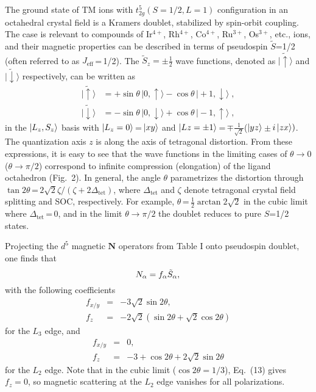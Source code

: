 \documentclass[twocolumn,prb,aps,showpacs,superscriptaddress]{revtex4-1}
\begin{document}
The ground state of TM ions with $t_{2g}^5(S=1/2, L=1)$ configuration in
an octahedral crystal field is a Kramers doublet, stabilized by spin-orbit 
coupling. The case is relevant to compounds of Ir$^{4+}$, Rh$^{4+}$,
Co$^{4+}$, Ru$^{3+}$, Os$^{3+}$, etc., ions, and their magnetic properties
can be described in terms of pseudospin $\tilde{S}$=1/2 
\cite{Abragam,Kha04,Khaliullin05,KimPRL08,JackeliPRL09,KimSci09} 
(often referred to as $J_{\textrm{eff}}$\,=\,1/2). 
The $\tilde{S}_z=\pm\tfrac12$ wave functions, denoted as 
$|\tilde\uparrow\rangle$ and $|\tilde\downarrow\rangle$ respectively, 
can be written as 
\begin{align}
|\tilde\uparrow\rangle &=+\sin\theta\, |0,\uparrow\rangle 
-\cos\theta\, |+1,\downarrow\rangle \;, \\ 
|\tilde\downarrow\rangle &=-\sin\theta\, |0,\downarrow\rangle 
+\cos\theta\, |-1,\uparrow\rangle \;, 
\end{align}
\noindent
in the $\ket{L_z,S_z}$ basis with $\ket{L_z=0}$\,=\,$\ket{xy}$ and 
$\ket{Lz=\pm 1}$\,=\,$\mp\frac{1}{\sqrt{2}}$($\ket{yz}$\,$\pm$\,$i\ket{zx})$.  
The quantization axis $z$ is along the axis of tetragonal distortion. From
these expressions, it is easy to see that the wave functions in the limiting 
cases of $\theta\rightarrow0$ ($\theta\rightarrow\pi/2$)
correspond to infinite compression (elongation) of the ligand octahedron
(Fig.~2). In general, the angle $\theta$ parametrizes the distortion through
$\tan2\theta$\,=\,$2\sqrt{2}\zeta/(\zeta+2\Delta_{\textrm{tet}})$, where
$\Delta_{\textrm{tet}}$ and $\zeta$ denote tetragonal crystal field splitting
and SOC, respectively. For example,
$\theta$\,=\,$\frac{1}{2}\arctan{2\sqrt{2}}$ in the cubic limit where
$\Delta_{\textrm{tet}}$\,=\,0, and in the limit $\theta\rightarrow\pi/2$ the
doublet reduces to pure $S$=1/2 states.  
 
Projecting the $d^5$ magnetic ${\mathbf N}$ operators from Table I onto
pseudospin doublet, one finds that 
\begin{equation}
 N_{\alpha}=f_{\alpha}\tilde{S}_{\alpha},\\
\end{equation}
with the following coefficients 
\begin{eqnarray}
f_{x/y}&=&-3\sqrt{2}\sin{2\theta}, \\ 
f_z&=&-2\sqrt{2}(\sin{2\theta}+\sqrt{2}\cos{2\theta})
\end{eqnarray}
for the $L_3$ edge, and
\begin{eqnarray}
f_{x/y}&=&0, \\
f_z&=&-3+\cos{2\theta}+2\sqrt{2}\sin{2\theta}
\end{eqnarray}
for the $L_2$ edge. Note that in the cubic limit ($\cos{2\theta}=1/3$),
Eq.~(13) gives $f_z=0$, so magnetic scattering at the $L_2$ edge vanishes for 
all polarizations\cite{Ame11,Mat16}.   
 
\end{document}
